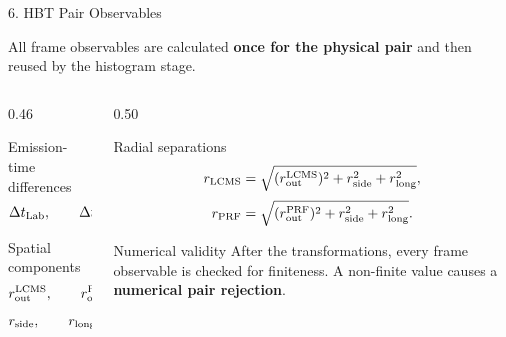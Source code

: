 \documentclass{beamer}
\begin{document}
\begin{frame}{6. HBT Pair Observables}
\fontsize{7.4}{8.3}\selectfont

\begin{center}
All frame observables are calculated \textbf{once for the physical pair} and then reused by the histogram stage.
\end{center}

\begin{columns}[T]

\begin{column}{0.46\textwidth}
\begin{block}{Emission-time differences}
\[
\Delta t_{\rm Lab},
\qquad
\Delta t_{\rm LCMS},
\qquad
\Delta t_{\rm PRF}
\]
\end{block}

\begin{block}{Spatial components}
\[
r_{\rm out}^{\rm LCMS},
\qquad
r_{\rm out}^{\rm PRF},
\]
\vspace{-0.45em}
\[
r_{\rm side},
\qquad
r_{\rm long}
\]
\end{block}
\end{column}

\begin{column}{0.50\textwidth}
\begin{block}{Radial separations}
\[
r_{\rm LCMS}=
\sqrt{(r_{\rm out}^{\rm LCMS})^2+r_{\rm side}^2+r_{\rm long}^2},
\]
\vspace{-0.45em}
\[
r_{\rm PRF}=
\sqrt{(r_{\rm out}^{\rm PRF})^2+r_{\rm side}^2+r_{\rm long}^2}.
\]
\end{block}

\begin{alertblock}{Numerical validity}
After the transformations, every frame observable is checked for finiteness. A non-finite value causes a \textbf{numerical pair rejection}.
\end{alertblock}
\end{column}

\end{columns}

\vfill
\begin{center}
\end{center}

\end{frame}
\end{document}
